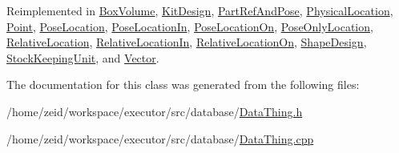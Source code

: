 Reimplemented in \hyperlink{class_box_volume_ad186a540505ac006ee58952ecaed35f8}{BoxVolume}, \hyperlink{class_kit_design_aea131638fcfa0e95c9152a60d62e0233}{KitDesign}, \hyperlink{class_part_ref_and_pose_a4089d24393c5b710e86d7841dde07bdd}{PartRefAndPose}, \hyperlink{class_physical_location_a22e72cd2fbf6d9b68192622961e8e4ce}{PhysicalLocation}, \hyperlink{class_point_a505b2c2e820cf9ef9dfdc66738a8c151}{Point}, \hyperlink{class_pose_location_a86c7f6e2a4610954bc530864d6d8ec52}{PoseLocation}, \hyperlink{class_pose_location_in_a0ed7e6d3b25f39f6cd6695f2675c595f}{PoseLocationIn}, \hyperlink{class_pose_location_on_a9948176529b12221d938e1e5b1828149}{PoseLocationOn}, \hyperlink{class_pose_only_location_aa51f136b549fd9ddc9a89246fa94c5bc}{PoseOnlyLocation}, \hyperlink{class_relative_location_a90865b7d18772c0fd40e71b2132f3f06}{RelativeLocation}, \hyperlink{class_relative_location_in_a62d119b3aac2aa9e728878a85971c7ce}{RelativeLocationIn}, \hyperlink{class_relative_location_on_a37515a33b782962408999037a2880654}{RelativeLocationOn}, \hyperlink{class_shape_design_a06b9ee8b31a62eca03a14adaa90626cf}{ShapeDesign}, \hyperlink{class_stock_keeping_unit_abeffab863d6d7bc4cc59d547c82f3815}{StockKeepingUnit}, and \hyperlink{class_vector_a164215fcc47e016d863562eb5ff93524}{Vector}.



The documentation for this class was generated from the following files:\begin{DoxyCompactItemize}
\item 
/home/zeid/workspace/executor/src/database/\hyperlink{_data_thing_8h}{DataThing.h}\item 
/home/zeid/workspace/executor/src/database/\hyperlink{_data_thing_8cpp}{DataThing.cpp}\end{DoxyCompactItemize}
